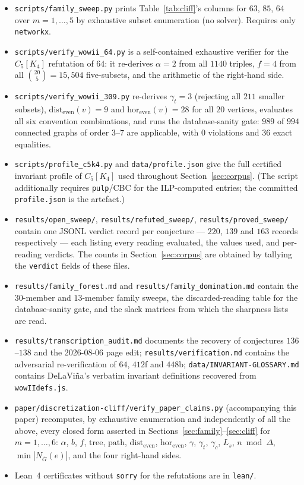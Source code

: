 \documentclass[10pt,a4paper]{article}
\theoremstyle{plain}
\theoremstyle{definition}
\newcommand{\ind}{\alpha}
\newcommand{\forestnum}{f}
\newcommand{\bipnum}{b}
\newcommand{\treenum}{\mathrm{tree}}
\newcommand{\pathnum}{\mathrm{path}}
\newcommand{\de}{\mathrm{dist_{even}}}
\newcommand{\eh}{\mathrm{hor_{even}}}
\newcommand{\gt}{\gamma_t}
\newcommand{\gc}{\gamma_c}
\newcommand{\Ls}{L_s}
\newcommand{\blow}[2]{#1[K_{#2}]}
\begin{document}
\begin{sloppypar}\begin{itemize}
\item \texttt{scripts/family\_sweep.py} prints Table~\ref{tab:cliff}'s columns for
$63$, $85$, $64$ over $m = 1,\dots,5$ by exhaustive subset enumeration (no
solver). Requires only \texttt{networkx}.
\item \texttt{scripts/verify\_wowii\_64.py} is a self-contained exhaustive verifier for the
$\blow{C_5}{4}$ refutation of $64$: it re-derives $\ind = 2$ from all $1140$ triples,
$\forestnum = 4$ from all $\binom{20}{5} = 15{,}504$ five-subsets, and the arithmetic of the
right-hand side.
\item \texttt{scripts/verify\_wowii\_309.py} re-derives $\gt = 3$ (rejecting all $211$ smaller
subsets), $\de(v) = 9$ and $\eh(v) = 28$ for all $20$ vertices, evaluates all six
convention combinations, and runs the database-sanity gate: $989$ of $994$ connected graphs of
order $3$--$7$ are applicable, with $0$ violations and $36$ exact equalities.
\item \texttt{scripts/profile\_c5k4.py} and \texttt{data/profile.json} give the full certified
invariant profile of $\blow{C_5}{4}$ used throughout Section~\ref{sec:corpus}. (The script
additionally requires \texttt{pulp}/CBC for the ILP-computed entries; the committed
\texttt{profile.json} is the artefact.)
\item \texttt{results/open\_sweep/}, \texttt{results/refuted\_sweep/},
\texttt{results/proved\_sweep/} contain one JSONL verdict record per conjecture --- $220$,
$139$ and $163$ records respectively --- each listing every reading evaluated, the values used,
and per-reading verdicts. The counts in Section~\ref{sec:corpus} are obtained by tallying the
\texttt{verdict} fields of these files.
\item \texttt{results/family\_forest.md} and \texttt{results/family\_domination.md} contain the
$30$-member and $13$-member family sweeps, the discarded-reading table for the
database-sanity gate, and the slack matrices from which the sharpness lists are read.
\item \texttt{results/transcription\_audit.md} documents the recovery of conjectures $136$--$138$
and the 2026-08-06 page edit; \texttt{results/verification.md} contains the adversarial
re-verification of $64$, $412$f and $448$b; \texttt{data/INVARIANT-GLOSSARY.md} contains
DeLaVi\~na's verbatim invariant definitions recovered from \texttt{wowIIdefs.js}.
\item \texttt{paper/dis\-cre\-ti\-za\-tion-cliff/verify\_paper\_claims.py} (accompanying this paper)
recomputes, by exhaustive enumeration and independently of all the above, every closed form
asserted in Sections~\ref{sec:family}--\ref{sec:cliff} for $m = 1,\dots,6$:
$\ind$, $\bipnum$, $\forestnum$, $\treenum$, $\pathnum$, $\de$, $\eh$, $\gamma$, $\gt$, $\gc$,
$\Ls$, $n \bmod \Delta$, $\min|N_{\overline{G}}(e)|$, and the four right-hand sides.
\item Lean~4 certificates without \texttt{sorry} for the refutations are in \texttt{lean/}.
\end{itemize}\end{sloppypar}
\end{document}
